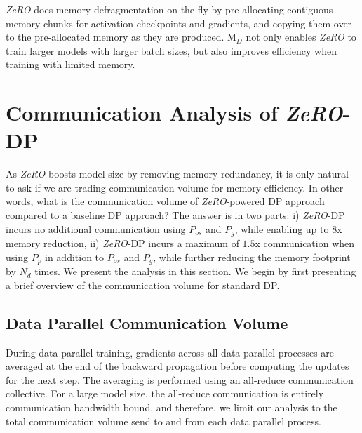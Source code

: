 \documentclass{article}
\newcommand{\name}{\emph{ZeRO}\xspace}
\begin{document}
\name does memory defragmentation on-the-fly by pre-allocating contiguous memory chunks for activation checkpoints and gradients, and copying them over to the pre-allocated memory as they are produced. M$_D$ not only enables \name to train larger models with larger batch sizes, but also improves efficiency when training with limited memory.  
  
\section{Communication Analysis of \name-DP}\label{sec:communication}

As \name boosts model size by removing memory redundancy, it is only natural to ask if we are trading communication volume for memory efficiency. In other words, what is the communication volume of \name-powered DP approach compared to a baseline DP approach?
The answer is in two parts: i) \name-DP incurs no additional communication using $P_{os}$ and $P_g$, while enabling up to 8x memory reduction,
ii) \name-DP incurs a maximum of $1.5$x communication when using $P_p$ in addition to $P_{os}$ and $P_{g}$, while further reducing the memory footprint by $N_d$ times.
We present the analysis in this section.  
We begin by first presenting a brief overview of the communication volume for standard DP. 

\subsection{Data Parallel Communication Volume}
During data parallel training, gradients across all data parallel processes are averaged at the end of the backward propagation before computing the updates for the next step. The averaging is performed using an all-reduce communication collective. For a large model size, the all-reduce communication is entirely communication bandwidth bound, and therefore, we limit our analysis to the total communication volume send to and from each data parallel process.
\end{document}
